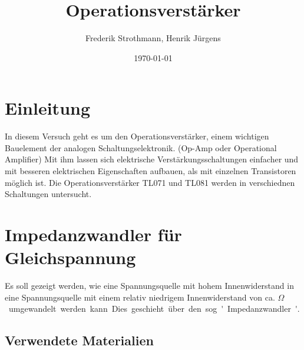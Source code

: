 \documentclass[12pt,a4paper]{article}
\title{Operationsverstärker}
\author{Frederik Strothmann, Henrik Jürgens}
\date{\today}
\begin{document}
\maketitle
\newpage
\tableofcontents
\newpage
\section{Einleitung}
In diesem Versuch geht es um den Operationsverstärker, einem wichtigen Bauelement der analogen Schaltungselektronik. (Op-Amp oder Operational Amplifier) Mit ihm lassen sich elektrische Verstärkungsschaltungen einfacher und mit besseren elektrischen Eigenschaften aufbauen, als mit einzelnen Transistoren möglich ist. Die Operationsverstärker TL071 und TL081 werden in verschiednen Schaltungen untersucht.
\section{Impedanzwandler für Gleichspannung}
Es soll gezeigt werden, wie eine Spannungsquelle mit hohem Innenwiderstand in eine Spannungsquelle mit einem relativ niedrigem Innenwiderstand von ca. \unit[100]{$\Omega$} umgewandelt werden kann. Dies geschieht über den sog. 'Impedanzwandler'.
\subsection{Verwendete Materialien}
\end{document}

